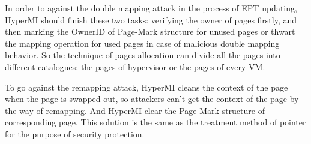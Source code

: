 \documentclass[conference]{IEEEtran}
\begin{document}
%
%
%

In order to against the double mapping attack in the process of EPT updating, HyperMI should finish these two tasks: verifying the owner of pages firstly, and then marking the OwnerID of Page-Mark structure for unused pages or thwart the mapping operation for used pages in case of malicious double mapping behavior. So the technique of pages allocation can divide all the pages into different catalogues: the pages of hypervisor or the pages of every VM.

To go against the remapping attack, HyperMI cleans the context of the page when the page is swapped out, so attackers can't get the context of the page by the way of remapping. And HyperMI clear the Page-Mark structure of corresponding page. This solution is the same as the treatment method of pointer for the purpose of security protection. 
\end{document}
